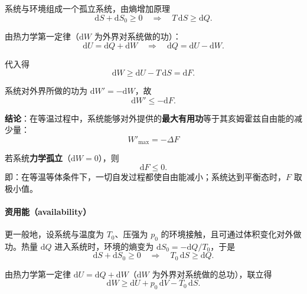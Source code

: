 \documentclass[UTF8]{ctexart}
\theoremstyle{definition}
\begin{document}
系统与环境组成一个孤立系统，由熵增加原理
\begin{equation}
\mathrm{d}S + \mathrm{d}S_0 \ge 0
\quad\Rightarrow\quad
T\,\mathrm{d}S \ge \mathrm{d}Q.
\end{equation}

由热力学第一定律（$\mathrm{d}W$ 为外界对系统做的功）：
\begin{equation}
\mathrm{d}U = \mathrm{d}Q + \mathrm{d}W
\quad\Rightarrow\quad
\mathrm{d}Q = \mathrm{d}U - \mathrm{d}W.
\end{equation}

代入得
\begin{equation}
\mathrm{d}W \ge \mathrm{d}U - T\,\mathrm{d}S = \mathrm{d}F.
\end{equation}

系统对外界所做的功为 $\mathrm{d}W'=-\mathrm{d}W$，故
\begin{equation}
\mathrm{d}W' \le -\mathrm{d}F.
\end{equation}

\textbf{结论}：在等温过程中，系统能够对外提供的\textbf{最大有用功}等于其亥姆霍兹自由能的减少量：
\begin{equation}
\boxed{W'_{\max} = -\Delta F}
\end{equation}

若系统\textbf{力学孤立}（$\mathrm{d}W=0$），则
\begin{equation}
\mathrm{d}F \le 0.
\end{equation}
即：在等温等体条件下，一切自发过程都使自由能减小；系统达到平衡态时，$F$ 取极小值。

\paragraph{资用能（availability）}

更一般地，设系统与温度为 $T_0$、压强为 $p_0$ 的环境接触，且可通过体积变化对外做功。热量 $\mathrm{d}Q$ 进入系统时，环境的熵变为 $\mathrm{d}S_0=-\mathrm{d}Q/T_0$，于是
\begin{equation}
\mathrm{d}S + \mathrm{d}S_0 \ge 0
\quad\Rightarrow\quad
T_0\,\mathrm{d}S \ge \mathrm{d}Q.
\end{equation}

由热力学第一定律 $\mathrm{d}U = \mathrm{d}Q + \mathrm{d}W$（$\mathrm{d}W$ 为外界对系统做的总功），联立得
\begin{equation}
\mathrm{d}W \ge \mathrm{d}U + p_0\,\mathrm{d}V - T_0\,\mathrm{d}S.
\end{equation}
\end{document}
